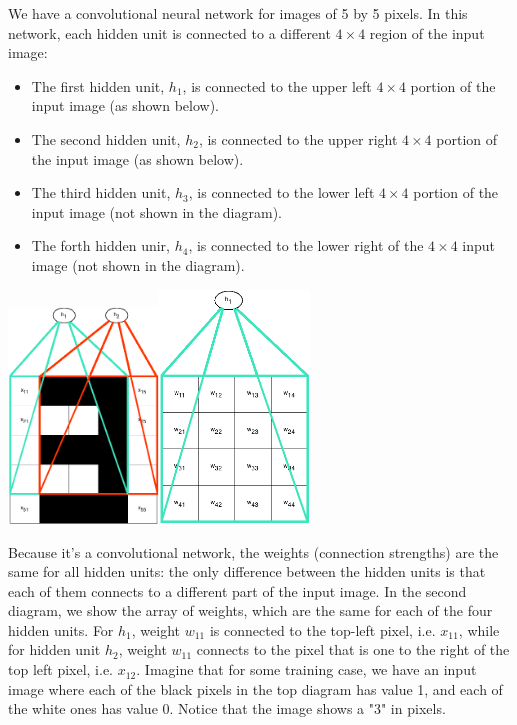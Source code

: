 \documentclass[paper=a4, fontsize=11pt]{scrartcl} %
\numberwithin{equation}{section} %
\numberwithin{figure}{section} %
\numberwithin{table}{section} %
\begin{document}
\begin{enumerate}
We have a convolutional neural network for images of 5 by 5 pixels. In this
network, each hidden unit is connected to a different $4\times4$ region of the
input image:
\begin{itemize}
\item The first hidden unit, $h_1$, is connected to the upper left $4\times4$ portion of the input image (as shown below).
\item The second hidden unit, $h_2$, is connected to the upper right $4\times4$ portion of the input image (as shown below).
\item The third hidden unit, $h_3$, is connected to the lower left $4\times4$ portion of the input image (not shown in the diagram).
\item The forth hidden unir, $h_4$, is connected to the lower right of the $4\times4$ input image (not shown in the diagram).
\end{itemize}
\hspace{2cm}\includegraphics[width=0.3\textwidth]{images/letterE.png}\hspace{2cm}\includegraphics[width=0.3\textwidth]{images/filterF.png}

Because it’s a convolutional network, the weights (connection strengths)
are the same for all hidden units: the only difference between the hidden
units is that each of them connects to a different part of the input image.
In the second diagram, we show the array of weights, which are the same
for each of the four hidden units. For $h_1$, weight $w_{11}$ is connected to the top-left pixel, i.e. $x_{11}$, while for hidden unit $h_2$, weight
$w_{11}$
connects to the pixel that is one to the right of
the top left pixel, i.e.
$x_{12}$. Imagine that for some training case, we have an
input image where each of the black pixels in the top diagram has value 1,
and each of the white ones has value 0. Notice that the image shows a "3"
in pixels.


\end{enumerate}
\end{document}
